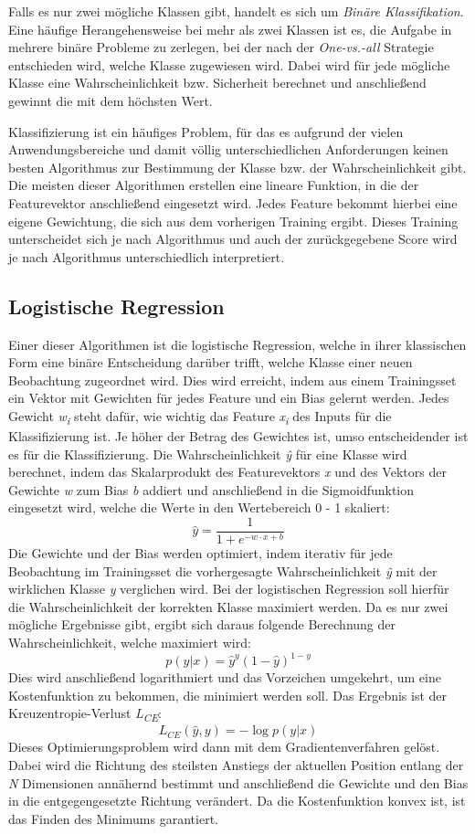 Falls es nur zwei mögliche Klassen gibt, handelt es sich um \emph{Binäre Klassifikation}. Eine häufige Herangehensweise bei mehr als zwei Klassen ist es, die Aufgabe in mehrere binäre Probleme zu zerlegen, bei der nach der \emph{One-vs.-all} Strategie entschieden wird, welche Klasse zugewiesen wird. Dabei wird für jede mögliche Klasse eine Wahrscheinlichkeit bzw. Sicherheit berechnet und anschließend gewinnt die mit dem höchsten Wert.

Klassifizierung ist ein häufiges Problem, für das es aufgrund der vielen Anwendungsbereiche und damit völlig unterschiedlichen Anforderungen keinen besten Algorithmus zur Bestimmung der Klasse bzw. der Wahrscheinlichkeit gibt. Die meisten dieser Algorithmen erstellen eine lineare Funktion, in die der Featurevektor anschließend eingesetzt wird. Jedes Feature bekommt hierbei eine eigene Gewichtung, die sich aus dem vorherigen Training ergibt. Dieses Training unterscheidet sich je nach Algorithmus und auch der zurückgegebene Score wird je nach Algorithmus unterschiedlich interpretiert.

\subsection{Logistische Regression}
Einer dieser Algorithmen ist die logistische Regression, welche in ihrer klassischen Form eine binäre Entscheidung darüber trifft, welche Klasse einer neuen Beobachtung zugeordnet wird. Dies wird erreicht, indem aus einem Trainingsset ein Vektor mit Gewichten für jedes Feature und ein Bias gelernt werden. Jedes Gewicht \textit{w\textsubscript{i}} steht dafür, wie wichtig das Feature \textit{x\textsubscript{i}} des Inputs für die Klassifizierung ist. Je höher der Betrag des Gewichtes ist, umso entscheidender ist es für die Klassifizierung. Die Wahrscheinlichkeit \textit{\^{y}} für eine Klasse wird berechnet, indem das Skalarprodukt des Featurevektors \textit{x} und des Vektors der Gewichte \textit{w} zum Bias \textit{b} addiert und anschließend in die Sigmoidfunktion eingesetzt wird, welche die Werte in den Wertebereich 0 - 1 skaliert: 
\[ \hat{y} = \frac{1}{1 + e^{-w \cdot x + b}} \]
Die Gewichte und der Bias werden optimiert, indem iterativ für jede Beobachtung im Trainingsset die vorhergesagte Wahrscheinlichkeit \textit{\^{y}} mit der wirklichen Klasse \textit{y} verglichen wird. Bei der logistischen Regression soll hierfür die Wahrscheinlichkeit der korrekten Klasse maximiert werden. Da es nur zwei mögliche Ergebnisse gibt, ergibt sich daraus folgende Berechnung der Wahrscheinlichkeit, welche maximiert wird:
\[ p(y|x) = \hat{y}^y (1-\hat{y})^{1-y} \]
Dies wird anschließend logarithmiert und das Vorzeichen umgekehrt, um eine Kostenfunktion zu bekommen, die minimiert werden soll. Das Ergebnis ist der Kreuzentropie-Verlust \textit{L\textsubscript{CE}}:
\[ L_{CE}(\hat{y},y) = -\log{p(y|x)} \]
Dieses Optimierungsproblem wird dann mit dem Gradientenverfahren gelöst. Dabei wird die Richtung des steilsten Anstiegs der aktuellen Position entlang der \textit{N} Dimensionen annähernd bestimmt und anschließend die Gewichte und den Bias in die entgegengesetzte Richtung verändert. Da die Kostenfunktion konvex ist, ist das Finden des Minimums garantiert.

